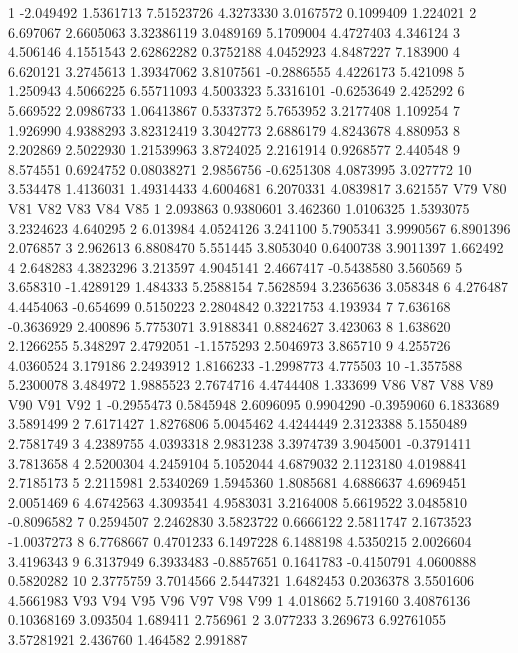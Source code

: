 \documentclass[12pt]{article}
\begin{document}
\begin{Schunk}
\begin{Soutput}
1  -2.049492 1.5361713 7.51523726 4.3273330  3.0167572  0.1099409 1.224021
2   6.697067 2.6605063 3.32386119 3.0489169  5.1709004  4.4727403 4.346124
3   4.506146 4.1551543 2.62862282 0.3752188  4.0452923  4.8487227 7.183900
4   6.620121 3.2745613 1.39347062 3.8107561 -0.2886555  4.4226173 5.421098
5   1.250943 4.5066225 6.55711093 4.5003323  5.3316101 -0.6253649 2.425292
6   5.669522 2.0986733 1.06413867 0.5337372  5.7653952  3.2177408 1.109254
7   1.926990 4.9388293 3.82312419 3.3042773  2.6886179  4.8243678 4.880953
8   2.202869 2.5022930 1.21539963 3.8724025  2.2161914  0.9268577 2.440548
9   8.574551 0.6924752 0.08038271 2.9856756 -0.6251308  4.0873995 3.027772
10  3.534478 1.4136031 1.49314433 4.6004681  6.2070331  4.0839817 3.621557
         V79        V80       V81       V82        V83        V84      V85
1   2.093863  0.9380601  3.462360 1.0106325  1.5393075  3.2324623 4.640295
2   6.013984  4.0524126  3.241100 5.7905341  3.9990567  6.8901396 2.076857
3   2.962613  6.8808470  5.551445 3.8053040  0.6400738  3.9011397 1.662492
4   2.648283  4.3823296  3.213597 4.9045141  2.4667417 -0.5438580 3.560569
5   3.658310 -1.4289129  1.484333 5.2588154  7.5628594  3.2365636 3.058348
6   4.276487  4.4454063 -0.654699 0.5150223  2.2804842  0.3221753 4.193934
7   7.636168 -0.3636929  2.400896 5.7753071  3.9188341  0.8824627 3.423063
8   1.638620  2.1266255  5.348297 2.4792051 -1.1575293  2.5046973 3.865710
9   4.255726  4.0360524  3.179186 2.2493912  1.8166233 -1.2998773 4.775503
10 -1.357588  5.2300078  3.484972 1.9885523  2.7674716  4.4744408 1.333699
          V86       V87        V88       V89        V90        V91        V92
1  -0.2955473 0.5845948  2.6096095 0.9904290 -0.3959060  6.1833689  3.5891499
2   7.6171427 1.8276806  5.0045462 4.4244449  2.3123388  5.1550489  2.7581749
3   4.2389755 4.0393318  2.9831238 3.3974739  3.9045001 -0.3791411  3.7813658
4   2.5200304 4.2459104  5.1052044 4.6879032  2.1123180  4.0198841  2.7185173
5   2.2115981 2.5340269  1.5945360 1.8085681  4.6886637  4.6969451  2.0051469
6   4.6742563 4.3093541  4.9583031 3.2164008  5.6619522  3.0485810 -0.8096582
7   0.2594507 2.2462830  3.5823722 0.6666122  2.5811747  2.1673523 -1.0037273
8   6.7768667 0.4701233  6.1497228 6.1488198  4.5350215  2.0026604  3.4196343
9   6.3137949 6.3933483 -0.8857651 0.1641783 -0.4150791  4.0600888  0.5820282
10  2.3775759 3.7014566  2.5447321 1.6482453  0.2036378  3.5501606  4.5661983
        V93      V94        V95         V96      V97      V98      V99
1  4.018662 5.719160 3.40876136  0.10368169 3.093504 1.689411 2.756961
2  3.077233 3.269673 6.92761055  3.57281921 2.436760 1.464582 2.991887

\end{Soutput}
\end{Schunk}
\end{document}
